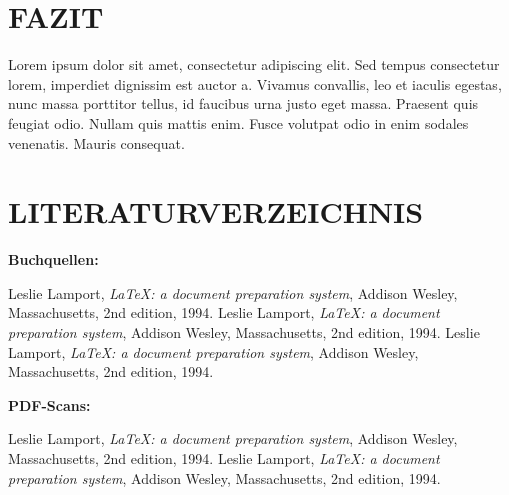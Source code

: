 \documentclass[a4paper,12pt]{article}
\begin{document}
\newpage
\section{FAZIT}
Lorem ipsum dolor sit amet, consectetur adipiscing elit. Sed tempus consectetur lorem, imperdiet dignissim est auctor a. Vivamus convallis, leo et iaculis egestas, nunc massa porttitor tellus, id faucibus urna justo eget massa. Praesent quis feugiat odio. Nullam quis mattis enim. Fusce volutpat odio in enim sodales venenatis. Mauris consequat.



\newpage
\section{LITERATURVERZEICHNIS}

\begingroup
\renewcommand{\section}[2]{}%
\begin{large}
\textbf{Buchquellen:}
\end{large}

\begin{thebibliography}{9}

      Leslie Lamport,
      \textit{\LaTeX: a document preparation system},
      Addison Wesley, Massachusetts,
      2nd edition,
      1994.
      Leslie Lamport,
      \textit{\LaTeX: a document preparation system},
      Addison Wesley, Massachusetts,
      2nd edition,
      1994.
      Leslie Lamport,
      \textit{\LaTeX: a document preparation system},
      Addison Wesley, Massachusetts,
      2nd edition,
      1994.

\end{thebibliography}

\vspace{1cm}

\begin{large}
\textbf{PDF-Scans:}
\end{large}

\begin{thebibliography}{9}

      Leslie Lamport,
      \textit{\LaTeX: a document preparation system},
      Addison Wesley, Massachusetts,
      2nd edition,
      1994.
      Leslie Lamport,
      \textit{\LaTeX: a document preparation system},
      Addison Wesley, Massachusetts,
      2nd edition,
      1994.

\end{thebibliography}
\end{document}
